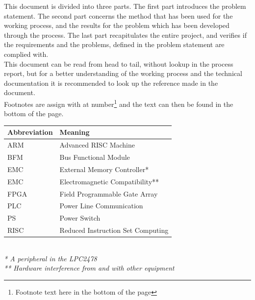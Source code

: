 This document is divided into three parts. The first part introduces the problem statement. The second part concerns the method that has been used for the working process, and the results for the problem which has been developed through the process. The last part recapitulates the entire project, and verifies if the requirements and the problems, defined in the problem statement are complied with.\\
This document can be read from head to tail, without lookup in the process report, but for a better understanding of the working process and the technical documentation it is recommended to look up the reference made in the document.\\
Footnotes are assign with at number\footnote{Footnote text here in the bottom of the page} and the text can then be found in the bottom of the page.
\begin{table}[H]
    \begin{tabular}{|l|l|}
        \hline
        \textbf{Abbreviation} & \textbf{Meaning} \\ \hline
        ARM		& Advanced RISC Machine \\ \hline
        BFM		& Bus Functional Module \\ \hline
        EMC		& External Memory Controller* \\ \hline
        EMC		& Electromagnetic Compatibility** \\ \hline
        FPGA	& Field Programmable Gate Array \\ \hline
        PLC		& Power Line Communication \\ \hline
        PS		& Power Switch \\ \hline
        RISC	& Reduced Instruction Set Computing \\
        \hline
    \end{tabular}\\
\textit{* A peripheral in the LPC2478}\\
\textit{** Hardware interference from and with other equipment}\\
\end{table}
